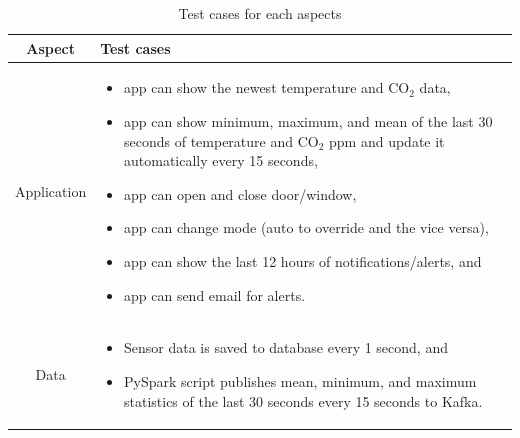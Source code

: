 \begin{table}
      \caption{Test cases for each aspects}
      \centering
      \begin{tabular}{|c|p{10cm}|}
            \hline
            \textbf{Aspect}          & \textbf{Test cases}
            \\
            \hline
            Application              & \begin{itemize}[leftmargin=*]
                                             \item app can show the newest
                                                   temperature and CO$_2$ data,
                                             \item app can show minimum, maximum, and
                                                   mean of the last 30 seconds of
                                                   temperature and CO$_2$ ppm and update it
                                                   automatically every 15 seconds,
                                             \item app can open and close door/window,
                                             \item app can change mode (auto to
                                                   override and the vice versa),
                                             \item app can show the last 12 hours of
                                                   notifications/alerts, and
                                             \item app can send email for alerts.
                                       \end{itemize}
            \\
            \hline
            Data                     & \begin{itemize}[leftmargin=*]
                                             \item Sensor data is saved to database
                                                   every 1 second, and
                                             \item PySpark script publishes mean,
                                                   minimum, and maximum statistics of the
                                                   last 30 seconds every 15 seconds to
                                                   Kafka.
                                       \end{itemize}

\end{tabular}
\end{table}
